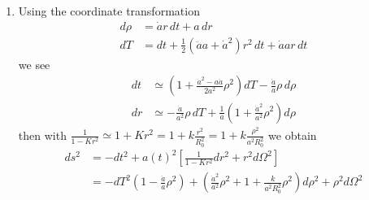 \documentclass[10pt,a4paper]{book}
\theoremstyle{definition}
\begin{document}
\begin{enumerate}
\item Using the coordinate transformation
\begin{align}
d\rho&=\dot{a}r\,dt+a\,dr\\
dT&=dt+\frac{1}{2}(\ddot{a}a+\dot{a}^2)r^2\,dt+\dot{a}ar\,dt
\end{align}
we see
\begin{align}
dt&\simeq \left(1+\frac{\dot{a}^2-a\ddot{a}}{2a^2}\rho^2\right)dT-\frac{\dot{a}}{a}\rho\,d\rho\\
dr&\simeq-\frac{\dot{a}}{a^2}\rho\,dT+\frac{1}{a}\left(1+\frac{\dot{a}^2}{a^2}\rho^2\right)d\rho
\end{align}
then with $\frac{1}{1-Kr^2}\simeq 1+Kr^2=1+k\frac{r^2}{R_0^2}=1+k\frac{\rho^2}{a^2R_0^2}$ we obtain
\begin{align}
ds^2
&=-dt^2+a(t)^2\left[\frac{1}{1-Kr^2} dr^2+r^2d\Omega^2\right]\\
&=-dT^2\left(1-\frac{\ddot{a}}{a}\rho^2\right)+\left(\frac{\dot{a}^2}{a^2}\rho^2+1+\frac{k}{a^2R_0^2}\rho^2\right) d\rho^2+\rho^2d\Omega^2
\end{align}
\end{enumerate}
\end{document}
